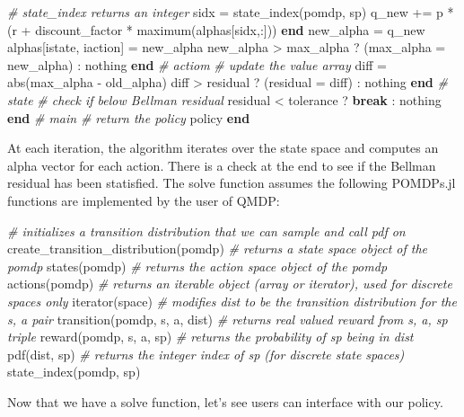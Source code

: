 \documentclass[12pt,]{article}
\newenvironment{Shaded}{}{}
\newcommand{\KeywordTok}[1]{\textcolor[rgb]{0.00,0.44,0.13}{\textbf{{#1}}}}
\newcommand{\CommentTok}[1]{\textcolor[rgb]{0.38,0.63,0.69}{\textit{{#1}}}}
\newcommand{\NormalTok}[1]{{#1}}
\begin{document}
\begin{Shaded}
\begin{Highlighting}[]
                    \CommentTok{# state_index returns an integer }
                    \NormalTok{sidx = state_index(pomdp, sp)}
                    \NormalTok{q_new += p * (r + discount_factor * maximum(alphas[sidx,:]))}
                \KeywordTok{end}
                \NormalTok{new_alpha = q_new}
                \NormalTok{alphas[istate, iaction] = new_alpha}
                \NormalTok{new_alpha > max_alpha ? (max_alpha = new_alpha) : nothing}
            \KeywordTok{end} \CommentTok{# actiom}
            \CommentTok{# update the value array}
            \NormalTok{diff = abs(max_alpha - old_alpha)}
            \NormalTok{diff > residual ? (residual = diff) : nothing}
        \KeywordTok{end} \CommentTok{# state}
        \CommentTok{# check if below Bellman residual      }
        \NormalTok{residual < tolerance ? }\KeywordTok{break} \NormalTok{: nothing }
    \KeywordTok{end} \CommentTok{# main}
    \CommentTok{# return the policy}
    \NormalTok{policy}
\KeywordTok{end}
\end{Highlighting}
\end{Shaded}

At each iteration, the algorithm iterates over the state space and
computes an alpha vector for each action. There is a check at the end to
see if the Bellman residual has been statisfied. The solve function
assumes the following POMDPs.jl functions are implemented by the user of
QMDP:

\begin{Shaded}
\begin{Highlighting}[]
\CommentTok{# initializes a transition distribution that we can sample and call pdf on}
\NormalTok{create_transition_distribution(pomdp) }
\CommentTok{# returns a state space object of the pomdp}
\NormalTok{states(pomdp) }
\CommentTok{# returns the action space object of the pomdp}
\NormalTok{actions(pomdp) }
\CommentTok{# returns an iterable object (array or iterator), used for discrete spaces only}
\NormalTok{iterator(space) }
\CommentTok{# modifies dist to be the transition distribution for the s, a pair}
\NormalTok{transition(pomdp, s, a, dist) }
\CommentTok{# returns real valued reward from s, a, sp triple}
\NormalTok{reward(pomdp, s, a, sp) }
\CommentTok{# returns the probability of sp being in dist}
\NormalTok{pdf(dist, sp) }
\CommentTok{# returns the integer index of sp (for discrete state spaces)}
\NormalTok{state_index(pomdp, sp) }
\end{Highlighting}
\end{Shaded}

Now that we have a solve function, let's see users can interface with
our policy.
\end{document}
